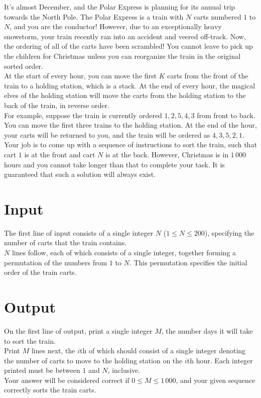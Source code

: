 
\noindent It's almost December, and the Polar Express is planning for its annual trip towards the North Pole. The Polar Express is a train with $N$ carts numbered $1$ to $N$, and you are the conductor! However, due to an exceptionally heavy snowstorm, your train recently ran into an accident and veered off-track. Now, the ordering of all of the carts have been scrambled! You cannot leave to pick up the children for Christmas unless you can reorganize the train in the original sorted order.\\

At the start of every hour, you can move the first $K$ carts from the front of the train to a holding station, which is a stack. At the end of every hour, the magical elves of the holding station will move the carts from the holding station to the back of the train, in reverse order.\\

For example, suppose the train is currently ordered $1, 2, 5, 4, 3$ from front to back. You can move the first three trains to the holding station. At the end of the hour, your carts will be returned to you, and the train will be ordered as $4, 3, 5, 2, 1$.\\

Your job is to come up with a sequence of instructions to sort the train, such that cart $1$ is at the front and cart $N$ is at the back. However, Christmas is in $1\,000$ hours and you cannot take longer than that to complete your task. It is guaranteed that such a solution will always exist.

\section*{Input}
The first line of input consists of a single integer $N$ ($1 \leq N \leq 200$), specifying the number of carts that the train contains.\\
$N$ lines follow, each of which consists of a single integer, together forming a permutation of the numbers from $1$ to $N$. This permutation specifies the initial order of the train carts.

\section*{Output}
On the first line of output, print a single integer $M$, the number days it will take to sort the train.\\
Print $M$ lines next, the $i$th of which should consist of a single integer denoting the number of carts to move to the holding station on the $i$th hour. Each integer printed must be between $1$ and $N$, inclusive.\\
Your answer will be considered correct if $0 \leq M \leq 1\,000$, and your given sequence correctly sorts the train carts.\\
